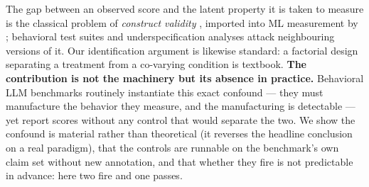 The gap between an observed score and the latent property it is taken to measure is the classical problem of \emph{construct validity} \citep{cronbach1955construct}, imported into ML measurement by \citet{jacobs2021measurement}; behavioral test suites \citep{ribeiro2020beyond} and underspecification analyses \citep{damour2020underspecification} attack neighbouring versions of it. Our identification argument is likewise standard: a factorial design separating a treatment from a co-varying condition is textbook. \textbf{The contribution is not the machinery but its absence in practice.} Behavioral LLM benchmarks routinely instantiate this exact confound --- they must manufacture the behavior they measure, and the manufacturing is detectable --- yet report scores without any control that would separate the two. We show the confound is material rather than theoretical (it reverses the headline conclusion on a real paradigm), that the controls are runnable on the benchmark's own claim set without new annotation, and that whether they fire is not predictable in advance: here two fire and one passes.
